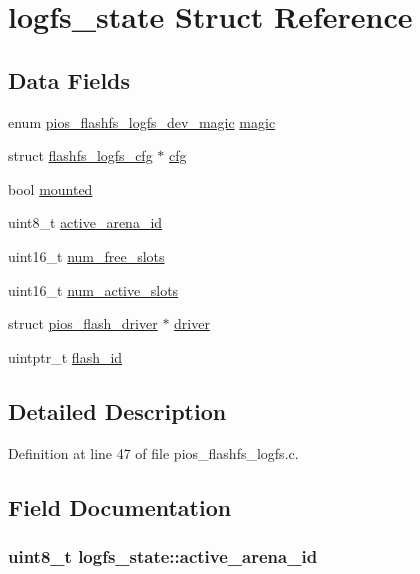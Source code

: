 \hypertarget{structlogfs__state}{\section{logfs\-\_\-state \-Struct \-Reference}
\label{structlogfs__state}
}
\subsection*{\-Data \-Fields}
\begin{DoxyCompactItemize}
\item 
enum \hyperlink{group___p_i_o_s___f_l_a_s_h_f_s_ga27472bb2a0fbfb6302378ef138c6a41f}{pios\-\_\-flashfs\-\_\-logfs\-\_\-dev\-\_\-magic} \hyperlink{structlogfs__state_acbcddf457808c9af84d6441f4f34be1e}{magic}
\item 
struct \hyperlink{structflashfs__logfs__cfg}{flashfs\-\_\-logfs\-\_\-cfg} $\ast$ \hyperlink{structlogfs__state_a75d82104dc14290000c26f57140773e6}{cfg}
\item 
bool \hyperlink{structlogfs__state_a5d12393331e2e5d7d9141f4437e09ccf}{mounted}
\item 
uint8\-\_\-t \hyperlink{structlogfs__state_a5bcf852bc8ba378be9bf82a602070073}{active\-\_\-arena\-\_\-id}
\item 
uint16\-\_\-t \hyperlink{structlogfs__state_a3c61a652819a886351af3431c8fe2061}{num\-\_\-free\-\_\-slots}
\item 
uint16\-\_\-t \hyperlink{structlogfs__state_a9606319a5f23b1dee579106c84bf198b}{num\-\_\-active\-\_\-slots}
\item 
struct \hyperlink{structpios__flash__driver}{pios\-\_\-flash\-\_\-driver} $\ast$ \hyperlink{structlogfs__state_a4bbe3d2fb54bc597953a0cf979ac57f3}{driver}
\item 
uintptr\-\_\-t \hyperlink{structlogfs__state_a29a28723508e259cd39e4ce4bff7827d}{flash\-\_\-id}
\end{DoxyCompactItemize}


\subsection{\-Detailed \-Description}


\-Definition at line 47 of file pios\-\_\-flashfs\-\_\-logfs.\-c.



\subsection{\-Field \-Documentation}
\hypertarget{structlogfs__state_a5bcf852bc8ba378be9bf82a602070073}{
\subsubsection[{active\-\_\-arena\-\_\-id}]{\setlength{\rightskip}{0pt plus 5cm}uint8\-\_\-t {\bf logfs\-\_\-state\-::active\-\_\-arena\-\_\-id}}}\label{structlogfs__state_a5bcf852bc8ba378be9bf82a602070073}


